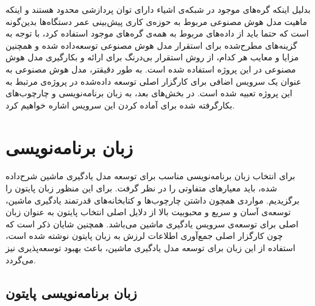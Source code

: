 بدلیل اینکه گره‌های موجود در شبکه‌ی اشیاء دارای توان پردازشی محدود هستند و اینکه ماهیت مدل هوش‌ مصنوعی مربوط به حوزه‌ی کاری پیش‌بینی عمر دستگاه‌ها بدین‌گونه است که حتما باید از داده‌های مربوط به همه‌ی گره‌های موجود استفاده کرد، با توجه به گزینه‌های مطرح‌شده برای استقرار مدل هوش مصنوعی توسعه‌داده شده و همچنین مزایا و معایب هر کدام، از روش استقرار بی‌درنگ برای ارائه و بکارگیری مدل هوش مصنوعی در این پروژه استفاده شده است. به طور دقیقتر، مدل هوش مصنوعی به عنوان یک سرویس اضافی برای کارگزار اصلی توسعه‌ داده‌شده در پروژه‌ی مرتبط 
به این پروژه تعبیه شده است. در بخش‌های بعد، به زبان برنامه‌نویسی و چارچوب‌های بکارگرفته شده برای آماده کردن این سرویس اشاره خواهیم کرد. 

\section{‌‌زبان برنامه‌نویسی}
برای انتخاب زبان برنامه‌نویسی مناسب برای توسعه مدل یادگیری ماشین شرح‌داده شده، باید معیارهای متفاوتی را در نظر گرفت. برای این منظور زبان پایتون را برگزیدیم. مواردی همچون داشتن چارچوب‌ها و کتابخانه‌های قدرتمند یادگیری ماشین، توسعه‌ی آسان و سریع و محبوبیت بالا از دلایل اصلی انتخاب پایتون به عنوان زبان اصلی برای توسعه‌ی سرویس یادگیری ماشین می‌باشد. همچنین شایان ذکر است که چون کارگزار اصلی جمع‌آوری اطلاعات لرزش به زبان پایتون نوشته شده است، استفاده از این زبان برای توسعه مدل یادگیری ماشین، باعث بهبود توسعه‌پذیری نیز می‌گردد. 

\subsection{زبان برنامه‌نویسی پایتون}
